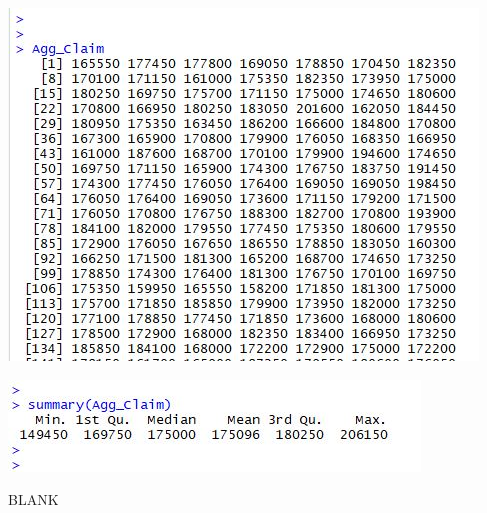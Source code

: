 \documentclass[a4paper,12pt]{article}
\begin{document}
\newpage 

\includegraphics[scale=1.5]{00-B2/images/B2_Agg_Claim_1.JPG}


\medskip
\includegraphics[scale=1.5]{00-B2/images/B2_Agg_Claim_2.JPG}

\newpage 
BLANK
\end{document}
